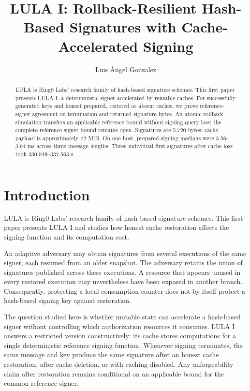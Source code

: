 \documentclass[a4paper,envcountsame,runningheads]{llncs}
\begin{document}
\raggedbottom
\title{LULA I: Rollback-Resilient Hash-Based Signatures with Cache-Accelerated Signing}
\author{Luis \'Angel Gonzalez}
\maketitle
\thispagestyle{plain}
\begin{abstract}
LULA is Ring0 Labs' research family of hash-based signature schemes. This first paper presents LULA I, a deterministic signer accelerated by reusable caches. For successfully generated keys and honest prepared, restored or absent caches, we prove reference-signer agreement on termination and returned signature bytes. An atomic rollback simulation transfers an applicable reference bound without signing-query loss; the complete reference-signer bound remains open. Signatures are 5,720 bytes; cache payload is approximately 72 MiB. On one host, prepared-signing medians were 3.56--3.64 ms across three message lengths. Three individual first signatures after cache loss took 330.049--337.563 s.
\end{abstract}

\section{Introduction}\label{sec:introduction}
LULA is Ring0 Labs' research family of hash-based signature schemes. This first paper presents LULA I and studies how honest cache restoration affects the signing function and its computation cost.

An adaptive adversary may obtain signatures from several executions of the same signer, each resumed from an older snapshot. The adversary retains the union of signatures published across these executions. A resource that appears unused in every restored execution may nevertheless have been exposed in another branch. Consequently, protecting a local consumption counter does not by itself protect a hash-based signing key against restoration.

The question studied here is whether mutable state can accelerate a hash-based signer without controlling which authorization resources it consumes. LULA I answers a restricted version constructively: its cache stores computations for a single deterministic reference signing function. Whenever signing terminates, the same message and key produce the same signature after an honest cache restoration, after cache deletion, or with caching disabled. Any unforgeability claim after restoration remains conditional on an applicable bound for the common reference signer.
\end{document}
